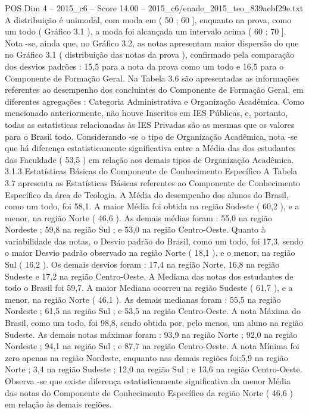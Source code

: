 \begin{textsample}{POS Dim 4 – 2015\_c6 – Score 14.00 – 2015\_c6/enade\_2015\_teo\_839aebf29e.txt}
A distribuição é unimodal, com moda em ( 50 ; 60 ], enquanto na prova, como um todo ( Gráfico 3.1 ), a moda foi alcançada um intervalo acima ( 60 ; 70 ].
Nota -se, ainda que, no Gráfico 3.2, as notas apresentam maior dispersão do que no Gráfico 3.1 ( distribuição das notas da prova ), confirmado pela comparação dos desvios padrões : 15,5 para a nota da prova como um todo e 16,5 para o Componente de Formação Geral.
Na Tabela 3.6 são apresentadas as informações referentes ao desempenho dos concluintes do Componente de Formação Geral, em diferentes agregações : Categoria Administrativa e Organização Acadêmica.
Como mencionado anteriormente, não houve Inscritos em IES Públicas, e, portanto, todas as estatísticas relacionadas às IES Privadas são as mesmas que os valores para o Brasil todo.
Considerando -se o tipo de Organização Acadêmica, nota -se que há diferença estatisticamente significativa entre a Média das dos estudantes das Faculdade ( 53,5 ) em relação aos demais tipos de Organização Acadêmica. 3.1.3 Estatísticas Básicas do Componente de Conhecimento Específico A Tabela 3.7 apresenta as Estatísticas Básicas referentes ao Componente de Conhecimento Específico da área de Teologia.
A Média do desempenho dos alunos do Brasil, como um todo, foi 58,1.
A maior Média foi obtida na região Sudeste ( 60,2 ), e a menor, na região Norte ( 46,6 ).
As demais médias foram : 55,0 na região Nordeste ; 59,8 na região Sul ; e 53,0 na região Centro-Oeste.
Quanto à variabilidade das notas, o Desvio padrão do Brasil, como um todo, foi 17,3, sendo o maior Desvio padrão observado na região Norte ( 18,1 ), e o menor, na região Sul ( 16,2 ).
Os demais desvios foram : 17,4 na região Norte, 16,8 na região Sudeste e 17,2 na região Centro-Oeste.
A Mediana das notas dos estudantes de todo o Brasil foi 59,7.
A maior Mediana ocorreu na região Sudeste ( 61,7 ), e a menor, na região Norte ( 46,1 ).
As demais medianas foram : 55,5 na região Nordeste ; 61,5 na região Sul ; e 53,5 na região Centro-Oeste.
A nota Máxima do Brasil, como um todo, foi 98,8, sendo obtida por, pelo menos, um aluno na região Sudeste.
As demais notas máximas foram : 93,9 na região Norte ; 92,0 na região Nordeste ; 94,1 na região Sul ; e 87,7 na região Centro-Oeste.
A nota Mínima foi zero apenas na região Nordeste, enquanto nas demais regiões foi:5,9 na região Norte ; 3,4 na região Sudeste ; 12,0 na região Sul ; e 13,6 na região Centro-Oeste.
Observa -se que existe diferença estatisticamente significativa da menor Média das notas do Componente de Conhecimento Específico da região Norte ( 46,6 ) em relação às demais regiões.

\end{textsample}
